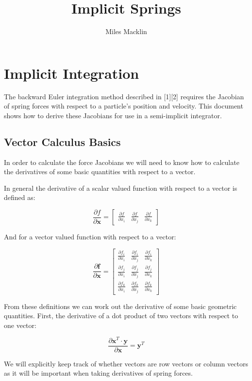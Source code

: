 \documentclass[11pt]{article}
\title{Implicit Springs}
\author{Miles Macklin}
\begin{document}
\maketitle

\section{Implicit Integration}
The backward Euler integration method described in [1][2] requires the Jacobian of spring forces with respect to a particle's position and velocity. This document shows how to derive these Jacobians for use in a semi-implicit integrator.

\subsection{Vector Calculus Basics}

\renewcommand{\v}[1]{\ensuremath{\mathbf{#1}}} %
\newcommand{\uv}[1]{\ensuremath{\mathbf{\hat{#1}}}} %
\newcommand\ddx[1]{\frac{\partial#1}{\partial \v{x} }} 
\newcommand\dd[2]{\frac{\partial#1}{\partial #2}} 

In order to calculate the force Jacobians we will need to know how to calculate the derivatives of some basic quantities with respect to a vector.

In general the derivative of a scalar valued function with respect to a vector is defined as:

\[\ddx{f} = \begin{bmatrix} \dd{f}{x_i} & \dd{f}{x_j} & \dd{f}{x_k} \end{bmatrix}\]

And for a vector valued function with respect to a vector:

\[\ddx{\v{f}} = \begin{bmatrix} \dd{f_i}{x_i} & \dd{f_i}{x_j} & \dd{f_i}{x_k} \\ \dd{f_j}{x_i} & \dd{f_j}{x_j} & \dd{f_j}{x_k} \\ \dd{f_k}{x_i} & \dd{f_k}{x_j} & \dd{f_k}{x_k} \end{bmatrix}\]

From these definitions we can work out the derivative of some basic geometric quantities. First, the derivative of a dot product of two vectors with respect to one vector:

\[\ddx{\v{x}^T \cdot \v{y}} = \v{y}^T \]

We will explicitly keep track of whether vectors are row vectors or column vectors as it will be important when taking derivatives of spring forces.
\end{document}
